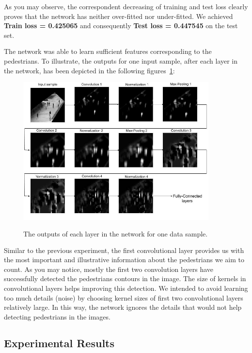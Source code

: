 As you may observe, the correspondent decreasing of training and test loss clearly proves that the network has neither over-fitted nor under-fitted. We achieved \textbf{Train loss = 0.425065} and consequently \textbf{Test loss = 0.447545} on the test set.

\noindent The network was able to learn sufficient features corresponding to the pedestrians. To illustrate, the outputs for one input sample, after each layer in the network, has been depicted in the following figures~\ref{fig:feats}: 



\begin{figure}[H]
	\centering
	{\includegraphics[width=0.9\textwidth]{images/ped_convs}}
	\caption{The outputs of each layer in the network for one data sample. }
	\label{fig:feats}
\end{figure}



Similar to the previous experiment, the first convolutional layer provides us with the most important and illustrative information about the pedestrians we aim to count. As you may notice, mostly the first two convolution layers have successfully detected the pedestrians contours in the image. The size of kernels in convolutional layers helps improving this detection. We intended to avoid learning too much details (noise) by choosing kernel sizes of first two convolutional layers relatively large. In this way, the network ignores the details that would not help detecting pedestrians in the images. 

\subsection{Experimental Results}

